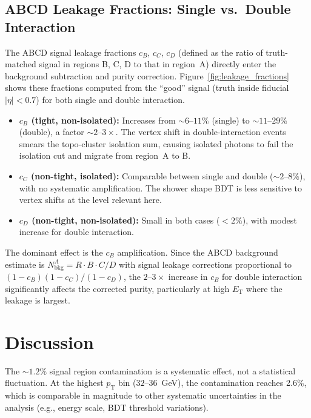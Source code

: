 \documentclass[11pt,letterpaper]{article}
\newcommand{\pT}{\ensuremath{p_{\text{T}}}}
\newcommand{\ET}{\ensuremath{E_{\text{T}}}}
\newcommand{\abseta}{\ensuremath{|\eta|}}
\begin{document}
\subsection{ABCD Leakage Fractions: Single vs.\ Double Interaction}
\label{sec:leakage_fractions}

The ABCD signal leakage fractions $c_B$, $c_C$, $c_D$ (defined as the ratio of
truth-matched signal in regions B, C, D to that in region~A) directly enter the
background subtraction and purity correction.  Figure~\ref{fig:leakage_fractions}
shows these fractions computed from the ``good'' signal (truth inside fiducial
$\abseta < 0.7$) for both single and double interaction.

\begin{itemize}
  \item \textbf{$c_B$ (tight, non-isolated):}  Increases from ${\sim}6$--$11\%$
    (single) to ${\sim}11$--$29\%$ (double), a factor ${\sim}2$--$3\times$.
    The vertex shift in double-interaction events smears the topo-cluster
    isolation sum, causing isolated photons to fail the isolation cut and migrate
    from region~A to B.

  \item \textbf{$c_C$ (non-tight, isolated):}  Comparable between single and
    double (${\sim}2$--$8\%$), with no systematic amplification.  The shower
    shape BDT is less sensitive to vertex shifts at the level relevant here.

  \item \textbf{$c_D$ (non-tight, non-isolated):}  Small in both cases
    ($< 2\%$), with modest increase for double interaction.
\end{itemize}

The dominant effect is the $c_B$ amplification.  Since the ABCD background
estimate is $N_\text{bkg}^A = R \cdot B \cdot C / D$ with signal leakage
corrections proportional to $(1 - c_B)(1 - c_C)/(1 - c_D)$, the $2$--$3\times$
increase in $c_B$ for double interaction significantly affects the corrected
purity, particularly at high $\ET$ where the leakage is largest.

\section{Discussion}
\label{sec:discussion}

The ${\sim}1.2\%$ signal region contamination is a systematic effect, not a
statistical fluctuation. At the highest $\pT$ bin ($32$--$36$~GeV), the
contamination reaches 2.6\%, which is comparable in magnitude to other
systematic uncertainties in the analysis (e.g., energy scale, BDT threshold
variations).
\end{document}
